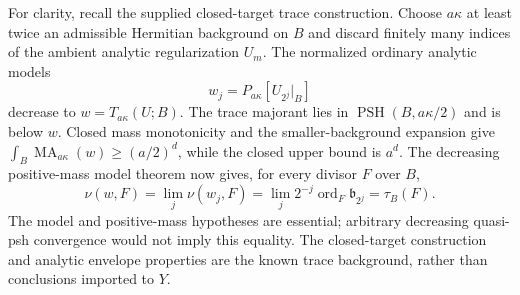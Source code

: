\documentclass[11pt]{article}
\newcommand{\PSH}{\operatorname{PSH}}
\newcommand{\MA}{\operatorname{MA}}
\newcommand{\ord}{\operatorname{ord}}
\theoremstyle{remark}\newtheorem{remark}[theorem]{Remark}
\begin{document}
For clarity, recall the supplied closed-target trace construction.
Choose $a\kappa$ at least twice an admissible Hermitian background on
$B$ and discard finitely many indices of the ambient analytic
regularization $U_m$. The normalized ordinary analytic models
\[
 w_j=P_{a\kappa}[U_{2^j}|_B]
\]
decrease to $w=T_{a\kappa}(U;B)$.
The trace majorant lies in $\PSH(B,a\kappa/2)$ and is below $w$.
Closed mass monotonicity and the smaller-background expansion give
$\int_B\MA_{a\kappa}(w)\ge(a/2)^d$, while the closed upper bound is
$a^d$. The decreasing positive-mass model theorem
\cite[Proposition 3.1.12]{SGPT} now gives, for every divisor $F$ over $B$,
\[
 \nu(w,F)=\lim_j\nu(w_j,F)
  =\lim_j2^{-j}\ord_F\mathfrak b_{2^j}=\tau_B(F).
 \tag{6}
\]
The model and positive-mass hypotheses are essential; arbitrary
decreasing quasi-psh convergence would not imply this equality.
The closed-target construction and analytic envelope properties are
the known trace background, rather than conclusions imported to $Y$.
\end{document}
